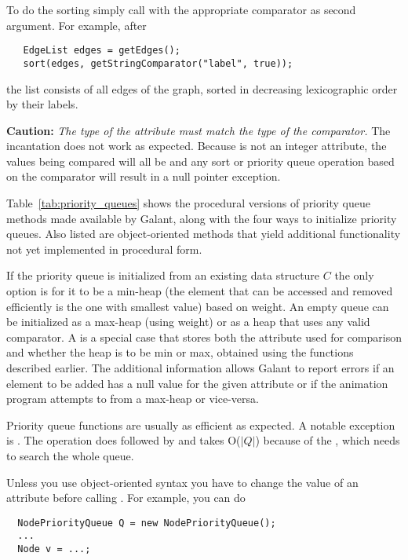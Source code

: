 To do the sorting simply call  with the appropriate comparator as
second argument. For example, after
\begin{verbatim}
   EdgeList edges = getEdges();
   sort(edges, getStringComparator("label", true));
\end{verbatim}
the list  consists of all edges of the graph, sorted in
decreasing lexicographic order by their labels.

\textbf{Caution:} \emph{The type of the attribute must match the type of the
  comparator.}
The incantation  does not work as
expected.
Because  is not an integer attribute, the values being compared
will all be  and any sort or priority queue operation based on the
comparator will result in a null pointer exception.

Table~\ref{tab:priority_queues} shows the procedural versions of priority
queue methods made available by Galant, along with the four ways to
initialize priority queues. Also listed are object-oriented methods that
yield additional functionality not yet implemented in procedural form.

If the priority queue is initialized from an existing data structure $C$ the
only option is for it to be a min-heap (the element that can be accessed and
removed efficiently is the one with smallest value) based on weight.
An empty queue can be initialized as a max-heap (using weight) or as a heap
that uses any valid comparator.
A  is a special case that stores both the
attribute used for comparison and whether the heap is to be min or max,
obtained using the  functions described
earlier.
The additional information allows Galant to report errors if an element to be
added has a null value for the given attribute or if the animation program
attempts to  from a max-heap or vice-versa.

Priority queue functions are usually as efficient as expected.
A notable exception is .
The operation 
does  followed by 
and takes O($|Q|$) because of the , which needs to search the
whole queue.

Unless you use object-oriented syntax you have to change the value of an
attribute before calling . For example, you can do

\begin{minipage}{0.9\textwidth}
\begin{verbatim}
  NodePriorityQueue Q = new NodePriorityQueue();
  ...
  Node v = ...;
\end{verbatim}
\end{minipage}

